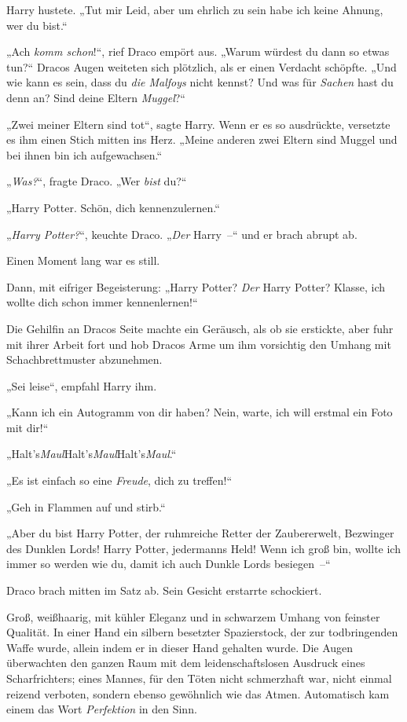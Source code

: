 Harry hustete. „Tut mir Leid, aber um ehrlich zu sein habe ich keine Ahnung, wer du bist.“

„Ach \emph{komm schon}!“, rief Draco empört aus. „Warum würdest du dann so etwas tun?“ Dracos Augen weiteten sich plötzlich, als er einen Verdacht schöpfte. „Und wie kann es sein, dass du \emph{die Malfoys} nicht kennst? Und was für \emph{Sachen} hast du denn an? Sind deine Eltern \emph{Muggel}?“

„Zwei meiner Eltern sind tot“, sagte Harry. Wenn er es so ausdrückte, versetzte es ihm einen Stich mitten ins Herz. „Meine anderen zwei Eltern sind Muggel und bei ihnen bin ich aufgewachsen.“

„\emph{Was?}“, fragte Draco. „Wer \emph{bist} du?“

„Harry Potter. Schön, dich kennenzulernen.“

„\emph{Harry Potter?}“, keuchte Draco. „\emph{Der} Harry –“ und er brach abrupt ab.

Einen Moment lang war es still.

Dann, mit eifriger Begeisterung: „Harry Potter? \emph{Der} Harry Potter? Klasse, ich wollte dich schon immer kennenlernen!“

Die Gehilfin an Dracos Seite machte ein Geräusch, als ob sie erstickte, aber fuhr mit ihrer Arbeit fort und hob Dracos Arme um ihm vorsichtig den Umhang mit Schachbrettmuster abzunehmen.

„Sei leise“, empfahl Harry ihm.

„Kann ich ein Autogramm von dir haben? Nein, warte, ich will erstmal ein Foto mit dir!“

„Halt's\emph{Maul}Halt's\emph{Maul}Halt's\emph{Maul}.“

„Es ist einfach so eine \emph{Freude}, dich zu treffen!“

„Geh in Flammen auf und stirb.“

„Aber du bist Harry Potter, der ruhmreiche Retter der Zaubererwelt, Bezwinger des Dunklen Lords! Harry Potter, jedermanns Held! Wenn ich groß bin, wollte ich immer so werden wie du, damit ich auch Dunkle Lords besiegen –“

Draco brach mitten im Satz ab. Sein Gesicht erstarrte schockiert.

Groß, weißhaarig, mit kühler Eleganz und in schwarzem Umhang von feinster Qualität. In einer Hand ein silbern besetzter Spazierstock, der zur todbringenden Waffe wurde, allein indem er in dieser Hand gehalten wurde. Die Augen überwachten den ganzen Raum mit dem leidenschaftslosen Ausdruck eines Scharfrichters; eines Mannes, für den Töten nicht schmerzhaft war, nicht einmal reizend verboten, sondern ebenso gewöhnlich wie das Atmen. Automatisch kam einem das Wort \emph{Perfektion} in den Sinn.

